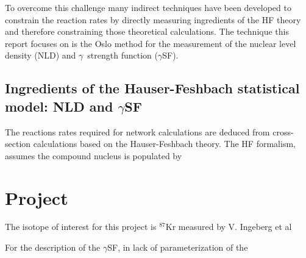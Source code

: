\documentclass{article}
\newcommand{\nuc}[2]{$^{#1#2}$}
\newcommand{\g}{$\gamma$}
\begin{document}
\par To overcome this challenge many indirect techniques have been developed to constrain the reaction rates by directly measuring ingredients of the HF theory and therefore constraining those theoretical calculations. The technique this report focuses on is the Oslo method for the measurement of the nuclear level density (NLD) and \g\, strength function (\g SF). 

\subsection*{Ingredients of the Hauser-Feshbach statistical model: NLD and \g SF}
The reactions rates required for network calculations are deduced from cross-section calculations based on the Hauser-Feshbach theory. The HF formalism, assumes the compound nucleus is populated by 


\section*{Project}

The isotope of interest for this project is \nuc87Kr measured by V. Ingeberg et al%
\par For the description of the \g SF, in lack of parameterization of the




\end{document}
